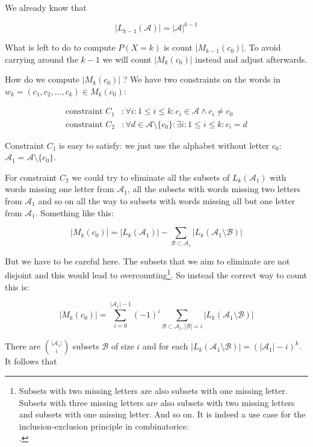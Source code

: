 We already know that 

$$
|L_{k-1}(\mathcal{A})| = |\mathcal{A}|^{k-1}
$$

What is left to do to compute $P(X=k)$ is count $|M_{k-1}(c_0)|$. To avoid carrying around the $k-1$ we will count $|M_k(c_0)|$ instead and adjust afterwards.

How do we compute $|M_k(c_0)|$ ? We have two constraints on the words in $w_k=(c_1, c_2, \ldots, c_k) \in M_k(c_0)$:

\begin{align*}
\text{constraint } C_1 &: \forall i: 1 \leq i \leq k: c_i \in \mathcal{A} \wedge c_i \neq c_0 \\
\text{constraint } C_2 &: \forall d \in \mathcal{A} \setminus \{c_0\}: \exists i: 1 \leq i \leq k: c_i = d
\end{align*}

Constraint $C_1$ is easy to satisfy: we just use the alphabet without letter $c_0$: $\mathcal{A}_1 = \mathcal{A} \setminus \{c_0\}$.

For constraint $C_2$ we could try to eliminate all the subsets of $L_{k}(\mathcal{A}_1)$ with words missing one letter from $\mathcal{A}_1$, all the subsets with words missing two letters from $\mathcal{A}_1$ and so on all the way to subsets with words missing all but one letter from $\mathcal{A}_1$. Something like this:

$$
|M_k(c_0)| = |L_k(\mathcal{A}_1)| - \sum_{\mathcal{B} \subset \mathcal{A}_1} |L_k(\mathcal{A}_1 \setminus \mathcal{B})|
$$

\newpage

But we have to be careful here. The subsets that we aim to eliminate are not disjoint and this would lead to overcounting\footnote{Subsets with two missing letters are also subsets with one missing letter. Subsets with three missing letters are also subsets with two missing letters and subsets with one missing letter. And so on. It is indeed a use case for the inclusion-exclusion principle in combinatorics: \\ .}. So instead the correct way to count this is:

$$
|M_k(c_0)| = \sum_{i = 0}^{|\mathcal{A}_1| - 1} (-1)^i \sum_{\mathcal{B} \subset \mathcal{A}_1, |\mathcal{B}|=i} |L_k(\mathcal{A}_1 \setminus \mathcal{B})|
$$

There are $\binom{|\mathcal{A}_1|}{i}$ subsets $\mathcal{B}$ of size $i$ and for each $|L_k(\mathcal{A}_1 \setminus \mathcal{B})| = (|\mathcal{A}_1| - i)^k$. It follows that

